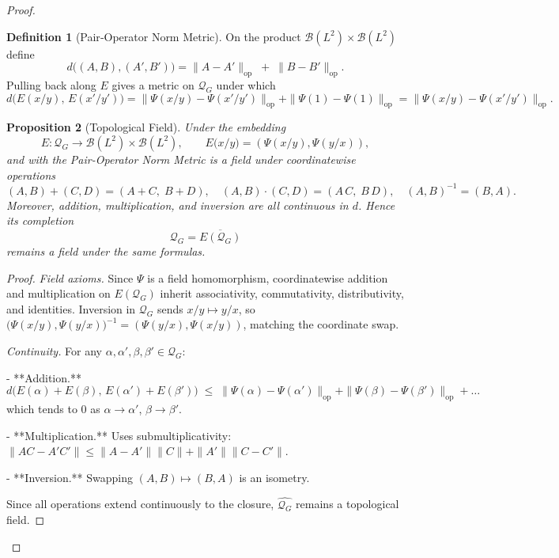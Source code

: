 \documentclass[11pt]{article}
\theoremstyle{definition}
\newtheorem{definition}{Definition}[section]
\theoremstyle{plain}
\newtheorem{proposition}[definition]{Proposition}
\theoremstyle{remark}
\begin{document}
\begin{proof}
\begin{definition}[Pair‐Operator Norm Metric]
On the product $\mathcal B(L^2)\times\mathcal B(L^2)$ define
\[
d\bigl((A,B),(A',B')\bigr)
=\|A-A'\|_{\mathrm{op}} \;+\; \|B-B'\|_{\mathrm{op}}.
\]
Pulling back along $E$ gives a metric on $\mathcal Q_G$ under which
\[
d\bigl(E(x/y),\,E(x'/y')\bigr)
=\|\Psi(x/y)-\Psi(x'/y')\|_{\mathrm{op}}+\|\Psi(1)-\Psi(1)\|_{\mathrm{op}}
=\|\Psi(x/y)-\Psi(x'/y')\|_{\mathrm{op}}.
\]
\end{definition}

\begin{proposition}[Topological Field]
Under the embedding
\[
  E\colon\mathcal Q_G\longrightarrow\mathcal B(L^2)\times\mathcal B(L^2),
  \qquad
  E\bigl(x/y\bigr)=(\Psi(x/y),\Psi(y/x)),
\]
and with the Pair-Operator Norm Metric is a field under coordinatewise
operations
\[
  (A,B)+(C,D)=(A+C,\;B+D),
  \quad
  (A,B)\cdot(C,D)=(A\,C,\;B\,D),
  \quad
  (A,B)^{-1}=(B,A).
\]
Moreover, addition, multiplication, and inversion are all continuous in \(d\).
Hence its completion 
\[
  \widehat{\mathcal Q_G}=\overline{E(\mathcal Q_G)}
\]
remains a field under the same formulas.
\end{proposition}

\begin{proof}
\emph{Field axioms.}  Since \(\Psi\) is a field homomorphism,
coordinatewise addition and multiplication on \(E(\mathcal Q_G)\) inherit
associativity, commutativity, distributivity, and identities.  Inversion
in \(\mathcal Q_G\) sends \(x/y\mapsto y/x\), so
\(\bigl(\Psi(x/y),\Psi(y/x)\bigr)^{-1}=(\Psi(y/x),\Psi(x/y))\), matching
the coordinate swap.

\medskip
\emph{Continuity.}
For any \(\alpha,\alpha',\beta,\beta'\in\mathcal Q_G\):

- **Addition.**  
  \[
    d\bigl(E(\alpha)+E(\beta),\,E(\alpha')+E(\beta')\bigr)
    \;\le\;
    \|\Psi(\alpha)-\Psi(\alpha')\|_{\!\mathrm{op}}
    +\|\Psi(\beta)-\Psi(\beta')\|_{\!\mathrm{op}}
    +\dots
  \]
  which tends to \(0\) as \(\alpha\to\alpha'\), \(\beta\to\beta'\).

- **Multiplication.**  Uses submultiplicativity:
  \(\|AC-A'C'\|\le\|A-A'\|\|C\|+\|A'\|\|C-C'\|\).

- **Inversion.**  Swapping \((A,B)\mapsto(B,A)\) is an isometry.

Since all operations extend continuously to the closure, \(\widehat{\mathcal Q_G}\)
remains a topological field.
\end{proof}


\end{proof}
\end{document}
